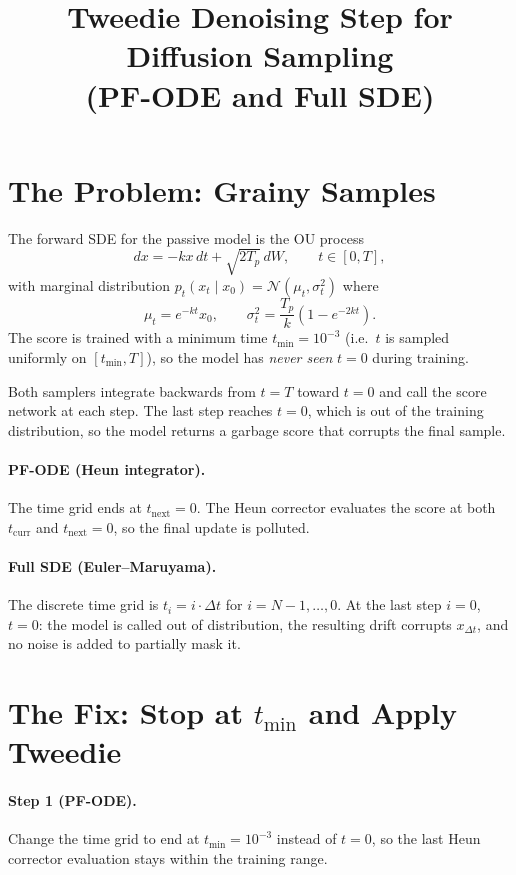 \documentclass[11pt]{article}
\title{Tweedie Denoising Step for Diffusion Sampling\\(PF-ODE and Full SDE)}
\author{}
\date{}
\begin{document}
\maketitle

\section{The Problem: Grainy Samples}

The forward SDE for the passive model is the OU process
\begin{equation}
dx = -kx\,dt + \sqrt{2T_p}\,dW, \qquad t \in [0, T],
\end{equation}
with marginal distribution $p_t(x_t \mid x_0) = \mathcal{N}(\mu_t, \sigma_t^2)$ where
\begin{equation}
\mu_t = e^{-kt} x_0, \qquad \sigma_t^2 = \frac{T_p}{k}(1 - e^{-2kt}).
\end{equation}
The score is trained with a minimum time $t_{\min} = 10^{-3}$ (i.e.\ $t$ is sampled uniformly
on $[t_{\min}, T]$), so the model has \emph{never seen} $t = 0$ during training.

Both samplers integrate backwards from $t = T$ toward $t = 0$ and call the score network
at each step.  The last step reaches $t = 0$, which is out of the training distribution,
so the model returns a garbage score that corrupts the final sample.

\paragraph{PF-ODE (Heun integrator).}
The time grid ends at $t_{\mathrm{next}} = 0$.
The Heun corrector evaluates the score at both $t_{\mathrm{curr}}$ and $t_{\mathrm{next}} = 0$,
so the final update is polluted.

\paragraph{Full SDE (Euler--Maruyama).}
The discrete time grid is $t_i = i\cdot\Delta t$ for $i = N-1, \ldots, 0$.
At the last step $i = 0$, $t = 0$: the model is called out of distribution,
the resulting drift corrupts $x_{\Delta t}$, and no noise is added to partially mask it.

\section{The Fix: Stop at $t_{\min}$ and Apply Tweedie}

\paragraph{Step 1 (PF-ODE).} Change the time grid to end at $t_{\min} = 10^{-3}$
instead of $t = 0$, so the last Heun corrector evaluation stays within the training range.
\end{document}
